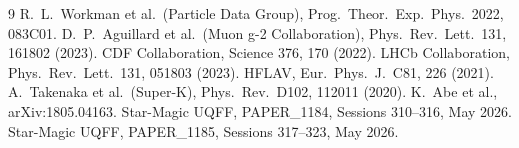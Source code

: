 \documentclass[11pt]{article}
\begin{document}
\begin{thebibliography}{9}
 R.\ L.\ Workman et al.\ (Particle Data Group), Prog.\ Theor.\ Exp.\ Phys.\ 2022, 083C01.
 D.\ P.\ Aguillard et al.\ (Muon g-2 Collaboration), Phys.\ Rev.\ Lett.\ 131, 161802 (2023).
 CDF Collaboration, Science 376, 170 (2022).
 LHCb Collaboration, Phys.\ Rev.\ Lett.\ 131, 051803 (2023).
 HFLAV, Eur.\ Phys.\ J.\ C81, 226 (2021).
 A.\ Takenaka et al.\ (Super-K), Phys.\ Rev.\ D102, 112011 (2020).
 K.\ Abe et al., arXiv:1805.04163.
 Star-Magic UQFF, PAPER\_1184, Sessions 310--316, May 2026.
 Star-Magic UQFF, PAPER\_1185, Sessions 317--323, May 2026.
\end{thebibliography}
\end{document}
